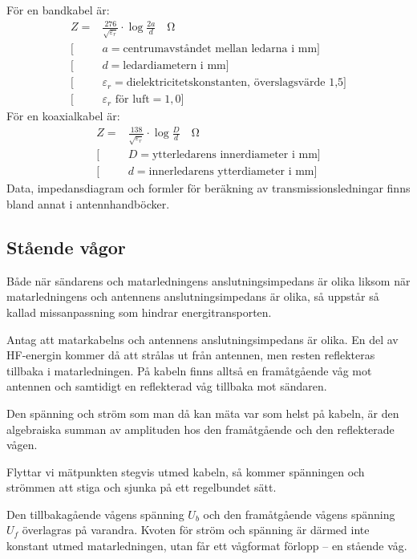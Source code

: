 \noindent
För en bandkabel är:
\begin{align*}
Z = & \frac{276}{\sqrt{\varepsilon_r}}\cdot\log\frac{2a}{d} \quad \unit{\ohm} \\
[&a = \text{centrumavståndet mellan ledarna i mm}] \\
[&d = \text{ledardiametern i mm}] \\
[&\varepsilon_r = \text{dielektricitetskonstanten, överslagsvärde 1,5}] \\
[&\varepsilon_r \text{ för luft} = 1,0]
\end{align*}
För en koaxialkabel är:
\begin{align*}
Z = & \frac{138}{\sqrt{\varepsilon_r}}\cdot\log\frac{D}{d} \quad \unit{\ohm} \\
[&D = \text{ytterledarens innerdiameter i mm}] \\
[&d = \text{innerledarens ytterdiameter i mm}]
\end{align*}
Data, impedansdiagram och formler för beräkning av transmissionsledningar
finns bland annat i antennhandböcker.


\subsection{Stående vågor}
\label{stående_vågor}

Både när sändarens och matarledningens anslutningsimpedans är olika
liksom när matarledningens och antennens anslutningsimpedans är olika,
så uppstår så kallad missanpassning som hindrar energitransporten.

Antag att matarkabelns och antennens anslutningsimpedans är olika.
En del av HF-energin kommer då att strålas ut från antennen, men resten
reflekteras tillbaka i matarledningen.
På kabeln finns alltså en framåtgående våg mot antennen och samtidigt en
reflekterad våg tillbaka mot sändaren.

Den spänning och ström som man då kan mäta var som helst på kabeln, är den
algebraiska summan av amplituden hos den framåtgående och den reflekterade
vågen.

Flyttar vi mätpunkten stegvis utmed kabeln, så kommer spänningen och
strömmen att stiga och sjunka på ett regelbundet sätt.

Den tillbakagående vågens spänning \(U_b\) och den framåtgående vågens
spänning \(U_f\) överlagras på varandra.
Kvoten för ström och spänning är därmed inte konstant utmed matarledningen,
utan får ett vågformat förlopp -- en stående våg.

